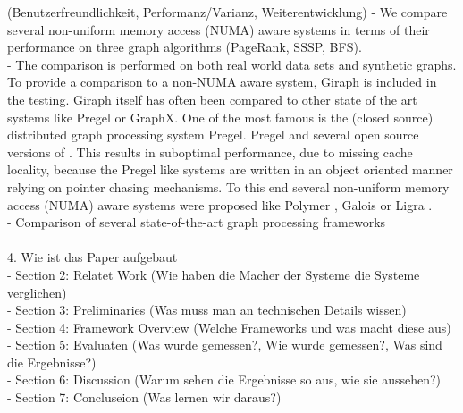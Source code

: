 (Benutzerfreundlichkeit, Performanz/Varianz, Weiterentwicklung)
- We compare several non-uniform memory access (NUMA) aware systems in terms of their performance on three graph algorithms (PageRank, SSSP, BFS).\\
- The comparison is performed on both real world data sets and synthetic graphs.
To provide a comparison to a non-NUMA aware system, Giraph\cite{Giraph} is included in the testing. Giraph itself has often been compared to other state of the art systems like Pregel or GraphX.
One of the most famous is the (closed source) distributed graph processing system Pregel. Pregel and several open source versions of .
This results in suboptimal performance, due to missing cache locality, because the Pregel like systems are written in an object oriented manner relying on pointer chasing mechanisms. To this end several non-uniform memory access (NUMA) aware systems were proposed like Polymer \cite{Polymer}, Galois \cite{Galois} or Ligra \cite{Ligra}.\\
- Comparison of several state-of-the-art graph processing frameworks\\
\\
4. Wie ist das Paper aufgebaut\\
- Section 2: Relatet Work (Wie haben die Macher der Systeme die Systeme verglichen)\\
- Section 3: Preliminaries (Was muss man an technischen Details wissen)\\
- Section 4: Framework Overview (Welche Frameworks und was macht diese aus)\\
- Section 5: Evaluaten (Was wurde gemessen?, Wie wurde gemessen?, Was sind die Ergebnisse?)\\
- Section 6: Discussion (Warum sehen die Ergebnisse so aus, wie sie aussehen?)\\
- Section 7: Concluseion (Was lernen wir daraus?)\\








